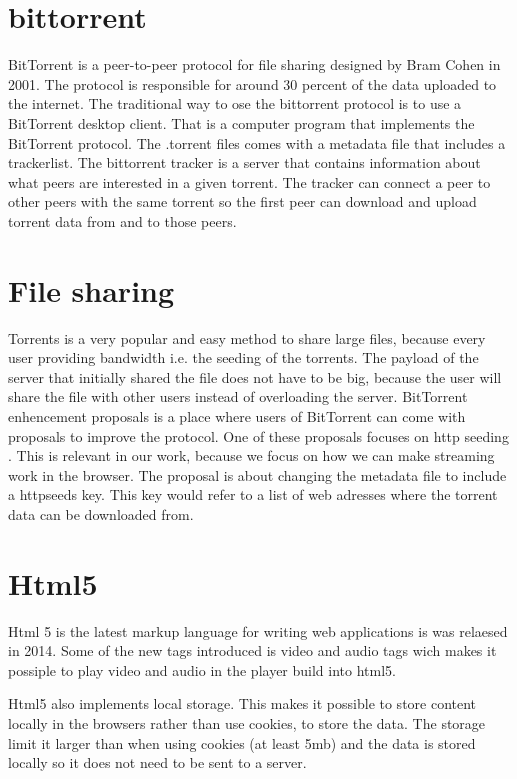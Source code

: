 \section{bittorrent}
BitTorrent \citep{bittorrent:bep03} is a peer-to-peer protocol for file sharing designed by Bram Cohen in 2001.
The protocol is responsible for around 30 percent of the data uploaded to the internet.
The traditional way to ose the bittorrent protocol is to use a BitTorrent desktop client. That is a computer program that implements the BitTorrent protocol.
The .torrent files comes with a metadata file that includes a trackerlist. The bittorrent tracker is a server that contains information about what peers are interested in a given torrent. The tracker can connect a peer to other peers with the same torrent so the first peer can download and upload torrent data from and to those peers.

\section{File sharing}
Torrents is a very popular and easy method to share large files, because every user providing bandwidth i.e. the seeding of the torrents.
The payload of the server that initially shared the file does not have to be big, because the user will share the file with other users instead of overloading the server.
BitTorrent enhencement proposals is a place where users of BitTorrent can come with proposals to improve the protocol.
One of these proposals focuses on http seeding \citep{bittorrent:bep17}.
This is relevant in our work, because we focus on how we can make streaming work in the browser. The proposal is about changing the metadata file to include a httpseeds key. This key would refer to a list of web adresses where the torrent data can be downloaded from.

\section{Html5}
Html 5 is the latest markup language for writing web applications is was relaesed in 2014. Some of the new tags introduced is video and audio tags wich makes it possiple to play video and audio in the player build into html5.

Html5 also implements local storage. This makes it possible to store content locally in the browsers rather than use cookies, to store the data.
The storage limit it larger than when using cookies (at least 5mb) and the data is stored locally so it does not need to be sent to a server.

